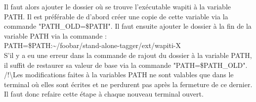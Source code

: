 \documentclass[manual-fr.tex]{subfiles}
\begin{document}
Il faut alors ajouter le dossier où se trouve l'exécutable wapiti à la
variable PATH. Il est préférable de d'abord créer une copie de cette variable
via la commande "PATH\_OLD=\$PATH". Il faut ensuite ajouter le dossier à la fin
de la variable PATH via la commande :\\

PATH=\$PATH:\~{}/foobar/stand-alone-tagger/ext/wapiti-X\\

S'il y a eu une erreur dans la commande de rajout du dossier à la variable PATH, il suffit de
restaurer sa valeur de base via la commande "PATH=\$PATH\_OLD".\\

/!\textbackslash Les modifications faites à la variables PATH ne sont valables que dans le
terminal où elles sont écrites et ne perdurent pas après la fermeture de ce
dernier. Il faut donc refaire cette étape à chaque nouveau terminal ouvert.
\end{document}
